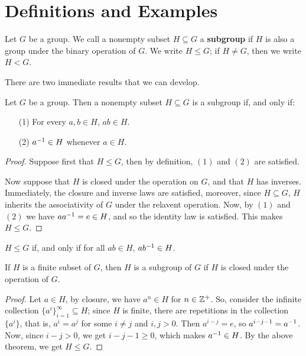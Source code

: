 \section{Definitions and Examples}
\label{section_1.2}

\begin{definition}
  Let $G$ be a group. We call a nonempty subset $H \subseteq G$ a
  \textbf{subgroup} if $H$ is also a group under the binary operation of  $G$.
  We write  $H \leq G$; if $H \neq G$, then we write $H < G$.
\end{definition}

There are two immediate results that we can develop.

\begin{theorem}\label{theorem_2.1.1}
  Let $G$ be a group. Then a nonempty subset  $H \subseteq G$ is a subgroup
  if, and only if:
  \begin{enumerate}
    \item[(1)] For every $a,b \in H$,  $ab \in H$.

    \item[(2)] $a^{-1} \in H$ whenever $a \in H$.
  \end{enumerate}
\end{theorem}
\begin{proof}
  Suppose first that $H \leq G$, then by definition, $(1)$ and $(2)$ are
  satisfied.

  Now suppose that $H$ is closed under the operation on  $G$, and that
  $H$ has inverses. Immediately, the closure and inverse laws are
  satisfied, moreover, since $H \subseteq G$,  $H$ inherits the associativity
  of  $G$ under the relavent operation. Now, by $(1)$ and $(2)$ we have
  $aa^{-1}=e \in H$, and so the identity law is satisfied. This makes $H \leq
  G$.
\end{proof}
\begin{corollary}
  $H \leq G$ if, and only if for all $ab \in H$, $ab^{-1} \in H$.
\end{corollary}
\begin{corollary}
  If $H$ is a finite subset of  $G$, then  $H$ is a subgroup of $G$ if  $H$ is
  closed under the operation of  $G$.
\end{corollary}
\begin{proof}
  Let $a \in H$, by closure, we have  $a^n \in H$ for $n \in \mathbb{Z}^+$. So,
  consider the infinite collection $\{a^i\}_{i=1}^\infty \subseteq H$; since
  $H$ is finite, there are repetitions in the collection  $\{a^i\}$, that is,
  $a^i=a^j$ for some  $i \neq j$ and  $i,j>0$. Then  $a^{i-j}=e$, so
  $a^{i-j-1}=a^{-1}$. Now, since $i-j>0$, we get  $i-j-1 \geq 0$, which makes
  $a^{-1} \in H$. By the above theorem, we get $H \leq G$.
\end{proof}

